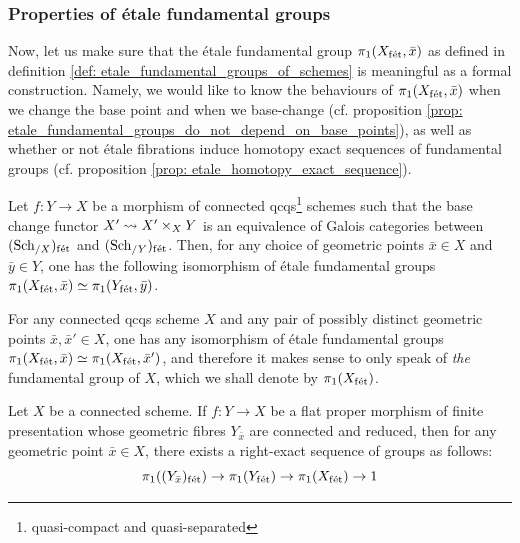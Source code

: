             \subsubsection{Properties of \'etale fundamental groups}
                Now, let us make sure that the \'etale fundamental group $\pi_1(X_{\mathrm{f\acute{e}t}}, \bar{x})$ as defined in definition \ref{def: etale_fundamental_groups_of_schemes} is meaningful as a formal construction. Namely, we would like to know the behaviours of $\pi_1(X_{\mathrm{f\acute{e}t}}, \bar{x})$ when we change the base point and when we base-change (cf. proposition \ref{prop: etale_fundamental_groups_do_not_depend_on_base_points}), as well as whether or not \'etale fibrations induce homotopy exact sequences of fundamental groups (cf. proposition \ref{prop: etale_homotopy_exact_sequence}). 
                \begin{proposition} \label{prop: etale_fundamental_groups_do_not_depend_on_base_points}
                    \cite[\href{https://stacks.math.columbia.edu/tag/0BQA}{Tag 0BQA}]{stacks} Let $f: Y \to X$ be a morphism of connected qcqs\footnote{quasi-compact and quasi-separated} schemes such that the base change functor $X' \mapsto X' \x_X Y$ is an equivalence of Galois categories between $(\mathrm{Sch}_{/X})_{\mathrm{f\acute{e}t}}$ and $(\mathrm{Sch}_{/Y})_{\mathrm{f\acute{e}t}}$. Then, for any choice of geometric points $\bar{x} \in X$ and $\bar{y} \in Y$, one has the following isomorphism of \'etale fundamental groups $\pi_1(X_{\mathrm{f\acute{e}t}}, \bar{x}) \simeq \pi_1(Y_{\mathrm{f\acute{e}t}}, \bar{y})$.
                \end{proposition}
                \begin{corollary} \label{coro: etale_fundamental_group_uniqueness}
                    For any connected qcqs scheme $X$ and any pair of possibly distinct geometric points $\bar{x}, \bar{x}' \in X$, one has any isomorphism of \'etale fundamental groups $\pi_1(X_{\mathrm{f\acute{e}t}}, \bar{x}) \simeq \pi_1(X_{\mathrm{f\acute{e}t}}, \bar{x}')$, and therefore it makes sense to only speak of \textit{the} fundamental group of $X$, which we shall denote by $\pi_1(X_{\mathrm{f\acute{e}t}})$.
                \end{corollary}
                
                \begin{proposition} \label{prop: etale_homotopy_exact_sequence}
                    \cite[\href{https://stacks.math.columbia.edu/tag/0C0J}{Tag 0C0J}]{stacks} Let $X$ be a connected scheme. If $f: Y \to X$ be a flat proper morphism of finite presentation whose geometric fibres $Y_{\bar{x}}$ are connected and reduced, then for any geometric point $\bar{x} \in X$, there exists a right-exact sequence of groups as follows:
                        $$\pi_1((Y_{\bar{x}})_{\mathrm{f\acute{e}t}}) \to \pi_1(Y_{\mathrm{f\acute{e}t}}) \to \pi_1(X_{\mathrm{f\acute{e}t}}) \to 1$$
                \end{proposition}
        
